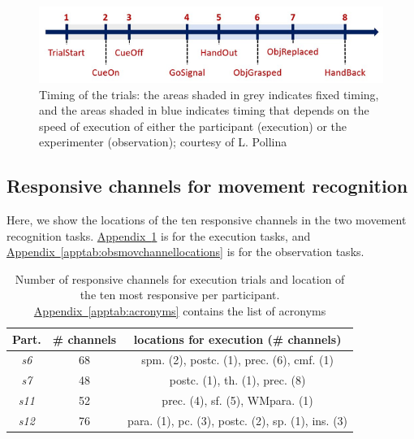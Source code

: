 \documentclass[10pt,conference,compsocconf]{IEEEtran}
\newcommand{\aref}[1]{\hyperref[#1]{Appendix~\ref*{#1}}}
\begin{document}
\begin{figure}[h!]
    \center
    \includegraphics[width=\linewidth]{images/2024-12-11-13-41-48.png}
    \caption{Timing of the trials: the areas shaded in grey indicates fixed timing, and the areas shaded in blue indicates timing that depends on the speed of execution of either the participant (execution) or the experimenter (observation); courtesy of L. Pollina}
    \label{appfig:timeline}
\end{figure}
\FloatBarrier

\subsection{Responsive channels for movement recognition}
Here, we show the locations of the ten responsive channels in the two movement recognition tasks. \aref{apptab:exmovchannellocations} is for the execution tasks, and \aref{apptab:obsmovchannellocations} is for the observation tasks.

\begin{table}[h!]
    \centering
    \begin{tabular}{| c | c | c |}
        \hline
        Part. & \# channels & locations for execution (\# channels) \\
        \hline
        \textit{s6} & 68 & spm. (2), postc. (1), prec. (6), cmf. (1) \\
        \hline
        \textit{s7} & 48 & postc. (1), th. (1), prec. (8)\\
        \hline
        \textit{s11} & 52 & prec. (4), sf. (5), WMpara. (1)\\
        \hline
        \textit{s12} & 76 & para. (1), pc. (3), postc. (2), sp. (1), ins. (3)\\
        \hline
    \end{tabular}
    \caption{Number of responsive channels for execution trials and location of the ten most responsive per participant. \aref{apptab:acronyms} contains the list of acronyms}
    \label{apptab:exmovchannellocations}
\end{table}
\end{document}
